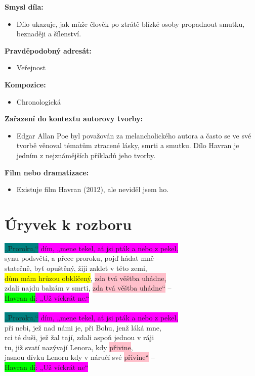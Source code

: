 \documentclass[12pt,a4paper]{article}
\begin{document}
\begin{tcolorbox}[breakable]
\textbf{Smysl díla:}
\begin{itemize}
\item Dílo ukazuje, jak může člověk po ztrátě blízké osoby propadnout smutku, beznaději a šílenství.
\end{itemize}

\textbf{Pravděpodobný adresát:}
\begin{itemize}
\item Veřejnost
\end{itemize}

\break
\textbf{Kompozice:}
\begin{itemize}
\item Chronologická
\end{itemize}

\textbf{Zařazení do kontextu autorovy tvorby:}
\begin{itemize}
\item Edgar Allan Poe byl považován za melancholického autora a často se ve své tvorbě věnoval tématům ztracené lásky, smrti a smutku. Dílo Havran je jedním z nejznámějších příkladů jeho tvorby.
\end{itemize}

\textbf{Film nebo dramatizace:}
\begin{itemize}
\item Existuje film Havran (2012), ale neviděl jsem ho.
\end{itemize}

\end{tcolorbox}

\section*{Úryvek k rozboru}

\colorbox{magenta}{\colorbox{teal}{„Proroku,“} dím, „mene tekel, ať jsi pták a nebo z pekel,}\\
synu podsvětí, a přece proroku, pojď hádat mně –\\
statečně, byť opuštěný, žiji zaklet v této zemi,\\
\colorbox{yellow}{dům mám hrůzou obklíčený}, \colorbox{pink}{zda tvá věštba uhádne,}\\
zdali najdu balzám v smrti, \colorbox{pink}{zda tvá věštba uhádne“} –\\
\colorbox{magenta}{\colorbox{lime}{Havran dí}: „Už víckrát ne.“} \\
\\
\colorbox{magenta}{\colorbox{teal}{„Proroku,“} dím, „mene tekel, ať jsi pták a nebo z pekel,}\\
při nebi, jež nad námi je, při Bohu, jenž láká mne,\\
rci té duši, jež žal tají, zdali aspoň jednou v ráji\\
tu, již svatí nazývají Lenora, kdy \colorbox{pink}{přivine},\\
jasnou dívku Lenoru kdy v náručí své \colorbox{pink}{přivine“} –\\
\colorbox{magenta}{\colorbox{lime}{Havran dí}: „Už víckrát ne“}\\
\end{document}
